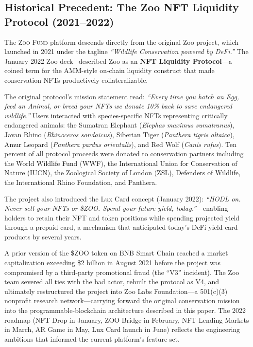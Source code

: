 \documentclass[11pt,letterpaper]{article}
\newcommand{\ZooFund}{\textsc{Zoo Fund}}
\begin{document}
\subsection{Historical Precedent: The Zoo NFT Liquidity Protocol (2021--2022)}
\label{sec:history}

The \ZooFund{} platform descends directly from the original Zoo project, which launched in 2021 under the tagline \emph{``Wildlife Conservation powered by DeFi.''} The January 2022 Zoo deck~\cite{zoodeck2022} described Zoo as an \textbf{NFT Liquidity Protocol}---a coined term for the AMM-style on-chain liquidity construct that made conservation NFTs productively collateralizable.

The original protocol's mission statement read: \emph{``Every time you hatch an Egg, feed an Animal, or breed your NFTs we donate 10\% back to save endangered wildlife.''} Users interacted with species-specific NFTs representing critically endangered animals: the Sumatran Elephant (\emph{Elephas maximus sumatranus}), Javan Rhino (\emph{Rhinoceros sondaicus}), Siberian Tiger (\emph{Panthera tigris altaica}), Amur Leopard (\emph{Panthera pardus orientalis}), and Red Wolf (\emph{Canis rufus}). Ten percent of all protocol proceeds were donated to conservation partners including the World Wildlife Fund (WWF), the International Union for Conservation of Nature (IUCN), the Zoological Society of London (ZSL), Defenders of Wildlife, the International Rhino Foundation, and Panthera.

The project also introduced the Lux Card concept (January 2022): \emph{``HODL on. Never sell your NFTs or \$ZOO. Spend your future yield, today.''}---enabling holders to retain their NFT and token positions while spending projected yield through a prepaid card, a mechanism that anticipated today's DeFi yield-card products by several years.

A prior version of the \$ZOO token on BNB Smart Chain reached a market capitalization exceeding \$2 billion in August 2021 before the project was compromised by a third-party promotional fraud (the ``V3'' incident). The Zoo team severed all ties with the bad actor, rebuilt the protocol as V4, and ultimately restructured the project into Zoo Labs Foundation---a 501(c)(3) nonprofit research network---carrying forward the original conservation mission into the programmable-blockchain architecture described in this paper. The 2022 roadmap (NFT Drop in January, ZOO Bridge in February, NFT Lending Markets in March, AR Game in May, Lux Card launch in June) reflects the engineering ambitions that informed the current platform's feature set.
\end{document}
